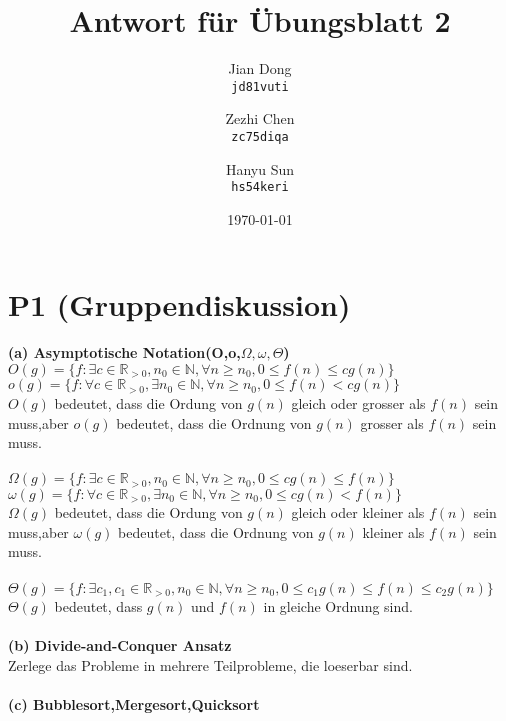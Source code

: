 \documentclass[a4paper,12pt]{article}
\begin{document}
\title{Antwort für Übungsblatt 2}
\author{
  Jian Dong\\
  \texttt{jd81vuti}
  \and
  Zezhi Chen\\
  \texttt{zc75diqa}
  \and
  Hanyu Sun\\
  \texttt{hs54keri}
}
\date{\today}
\maketitle

\section{P1 (Gruppendiskussion)}
\textbf{(a) Asymptotische Notation(O,o,$\Omega,\omega,\Theta$)} \\
$O(g)=\lbrace f:\exists c\in\mathbb{R}_{>0},n_{0}\in\mathbb{N},\forall n\ge n_{0},0\le f(n)\le cg(n) \rbrace$\\
$o(g)=\lbrace f:\forall c\in\mathbb{R}_{>0},\exists n_{0}\in\mathbb{N},\forall n\ge n_{0},0\le f(n)<cg(n) \rbrace$\\
$O(g)$ bedeutet, dass die Ordung von $g(n)$ gleich oder grosser als $f(n)$ sein muss,aber $o(g)$ bedeutet, dass die Ordnung von $g(n)$ grosser als $f(n)$ sein muss.\\
\\
$\Omega(g)=\lbrace f:\exists c\in\mathbb{R}_{>0},n_{0}\in\mathbb{N},\forall n\ge n_{0},0\le cg(n)\le f(n) \rbrace$\\
$\omega(g)=\lbrace f:\forall c\in\mathbb{R}_{>0},\exists n_{0}\in\mathbb{N},\forall n\ge n_{0},0\le cg(n)<f(n) \rbrace$\\
$\Omega(g)$ bedeutet, dass die Ordung von $g(n)$ gleich oder kleiner als $f(n)$ sein muss,aber $\omega(g)$ bedeutet, dass die Ordnung von $g(n)$ kleiner als $f(n)$ sein muss.\\
\\
$\Theta(g)=\lbrace f:\exists c_{1},c_{1}\in\mathbb{R}_{>0},n_{0}\in\mathbb{N},\forall n\ge n_{0},0\le c_{1}g(n)\le f(n) \le c_{2}g(n) \rbrace$\\
$\Theta(g)$ bedeutet, dass $g(n)$ und $f(n)$ in gleiche Ordnung sind.~\\~\\
\textbf{(b) Divide-and-Conquer Ansatz}\\
Zerlege das Probleme in mehrere Teilprobleme, die loeserbar sind.~\\~\\
\textbf{(c) Bubblesort,Mergesort,Quicksort}\\
\end{document}
